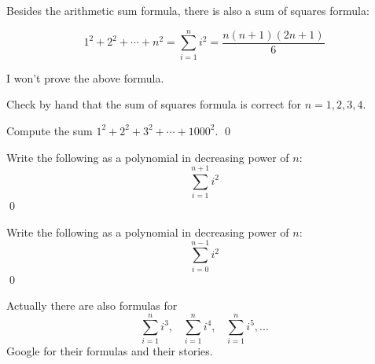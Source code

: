 \newpage
Besides the arithmetic sum formula,
there is also a sum of squares formula:

\begin{prop}
\[
1^2 + 2^2 + \cdots + n^2 = \sum_{i=1}^n i^2 = \frac{n(n+1)(2n+1)}{6}
\]
\end{prop}

I won't prove the above formula.


\newpage
\begin{ex}
Check by hand that 
the sum of squares formula is correct for $n = 1, 2, 3, 4$.
\end{ex}



\newpage
\begin{ex}
Compute the sum $1^2 + 2^2 + 3^2 + \cdots + 1000^2$.
\qed
\end{ex}



\newpage
\begin{ex}
Write the following as a polynomial in decreasing power of $n$:
\[
\sum_{i=1}^{n+1} i^2
\]
\qed
\end{ex}



\newpage
\begin{ex}
Write the following as a polynomial in decreasing power of $n$:
\[
\sum_{i=0}^{n-1} i^2
\]
\qed
\end{ex}


\newpage
Actually there are also formulas for 
\[
\sum_{i=1}^n i^3, \,\,\,\,\,
\sum_{i=1}^n i^4, \,\,\,\,\,
\sum_{i=1}^n i^5, ...
\]
Google for their formulas and their stories.
